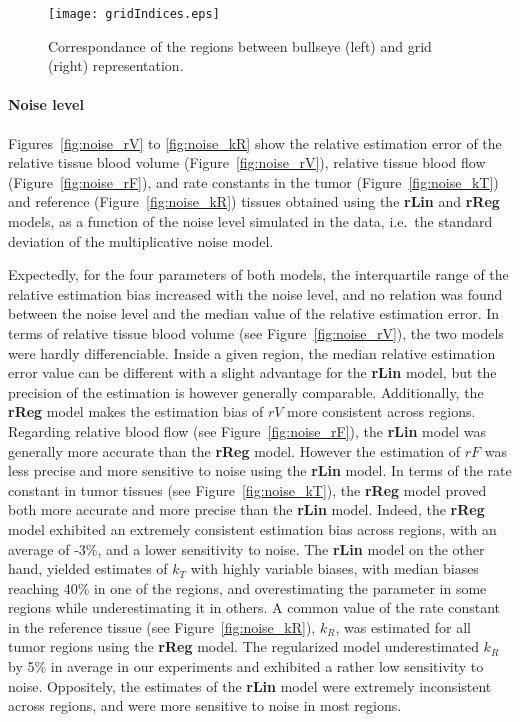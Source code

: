 \begin{figure}
\texttt{[image: gridIndices.eps]}
\caption{Correspondance of the regions between bullseye (left) and grid (right) representation.}
\label{fig:gridIndices}
\end{figure}

\paragraph{Noise level}
Figures~\ref{fig:noise_rV} to \ref{fig:noise_kR} show the relative estimation error of the relative tissue blood volume (Figure~\ref{fig:noise_rV}), relative tissue blood flow (Figure~\ref{fig:noise_rF}), and rate constants in the tumor (Figure~\ref{fig:noise_kT}) and reference  (Figure~\ref{fig:noise_kR}) tissues obtained using the \textbf{rLin} and \textbf{rReg} models, as a function of the noise level simulated in the data, i.e.~the standard deviation of the multiplicative noise model.

Expectedly, for the four parameters of both models, the interquartile range of the relative estimation bias increased with the noise level, and no relation was found between the noise level and the median value of the relative estimation error.
In terms of relative tissue blood volume (see Figure~\ref{fig:noise_rV}), the two models were hardly differenciable.
Inside a given region, the median relative estimation error value can be different with a slight advantage for the \textbf{rLin} model, but the precision of the estimation is however generally comparable.
Additionally, the \textbf{rReg} model makes the estimation bias of $rV$ more consistent across regions.
Regarding relative blood flow (see Figure~\ref{fig:noise_rF}), the \textbf{rLin} model was generally more accurate than the \textbf{rReg} model. 
However the estimation of $rF$ was less precise and more sensitive to noise using the \textbf{rLin} model.
In terms of the rate constant in tumor tissues (see Figure~\ref{fig:noise_kT}), the \textbf{rReg} model proved both more accurate and more precise than the \textbf{rLin} model.
Indeed, the \textbf{rReg} model exhibited an extremely consistent estimation bias across regions, with an average of -3\%, and a lower sensitivity to noise.
The \textbf{rLin} model on the other hand, yielded estimates of $k_T$ with highly variable biases, with median biases reaching 40\% in one of the regions, and overestimating the parameter in some regions while underestimating it in others.
A common value of the rate constant in the reference tissue (see Figure~\ref{fig:noise_kR}), $k_R$, was estimated for all tumor regions using the \textbf{rReg} model.
The regularized model underestimated $k_R$ by 5\% in average in our experiments and exhibited a rather low sensitivity to noise. 
Oppositely, the estimates of the \textbf{rLin} model were extremely inconsistent across regions, and were more sensitive to noise in most regions.

